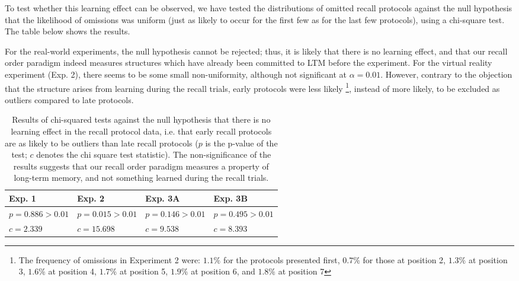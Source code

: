 To test whether this learning effect can be observed, we have tested the distributions of omitted recall protocols against the null hypothesis that the likelihood of omissions was uniform (just as likely to occur for the first few as for the last few protocols), using a chi-square test. The table below shows the results. 

For the real-world experiments, the null hypothesis cannot be rejected; thus, it is likely that there is no learning effect, and that our recall order paradigm indeed measures structures which have already been committed to LTM before the experiment. For the virtual reality experiment (Exp. 2), there seems to be some small non-uniformity, although not significant at $\alpha=0.01$. However, contrary to the objection that the structure arises from learning during the recall trials, early protocols were less likely \footnote{The frequency of omissions in Experiment 2 were: $1.1\%$ for the protocols presented first, $0.7 \%$ for those at position 2, $1.3\%$ at position 3, $1.6\%$ at position 4, $1.7\%$ at position 5, $1.9\%$ at position 6, and $1.8\%$ at position 7}, instead of more likely, to be excluded as outliers compared to late protocols. 

\begin{table}
	\centering
	\begin{tabularx}{\textwidth}{XXXX}
		\textbf{Exp. 1} & \textbf{Exp. 2} & \textbf{Exp. 3A}  & \textbf{Exp. 3B} \\ \hline
		$p=0.886 > 0.01$ & $p=0.015 > 0.01$ & $p=0.146 > 0.01$ & $p=0.495 > 0.01$  \\
		$c=2.339$ & $c=15.698$ & $c=9.538$ & $c=8.393$  \\ \hline
	\end{tabularx}
	\caption[Results of chi-squared tests against the null hypothesis that there is no learning effect in the recall protocol data]{Results of chi-squared tests against the null hypothesis that there is no learning effect in the recall protocol data, i.e. that early recall protocols are as likely to be outliers than late recall protocols ($p$ is the p-value of the test; $c$ denotes the chi square test statistic). The non-significance of the results suggests that our recall order paradigm measures a property of long-term memory, and not something learned during the recall trials.}
	\label{tbl_chisq}
\end{table}

